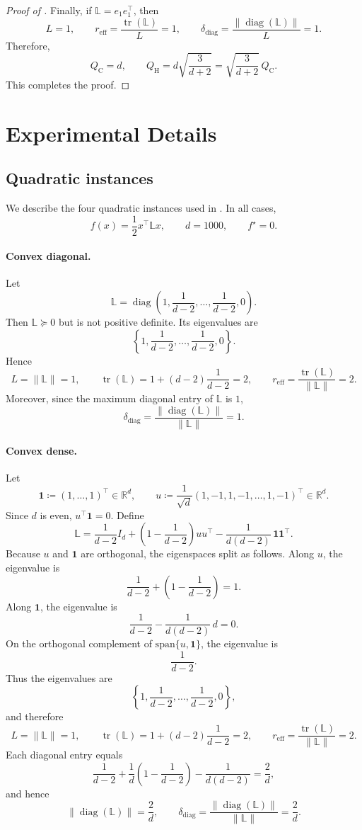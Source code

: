\documentclass[10pt]{article}
\newcommand{\tr}{\operatorname{tr}}
\newcommand{\diag}{\operatorname{diag}}
\newcommand{\R}{\mathbb{R}}
\newcommand{\Lmat}{\mathbb{L}}
\begin{document}
\begin{proof}[Proof of ]
Finally, if \(\Lmat=e_1e_1^\top\), then
\[
L=1,\qquad
r_{\mathrm{eff}}=\frac{\tr(\Lmat)}{L}=1,
\qquad
\delta_{\mathrm{diag}}=\frac{\|\diag(\Lmat)\|}{L}=1.
\]
Therefore,
\[
Q_{\mathrm C}=d,
\qquad
Q_{\mathrm H}
=
d\sqrt{\frac{3}{d+2}}
=
\sqrt{\frac{3}{d+2}}\,Q_{\mathrm C}.
\]
This completes the proof.
\end{proof}

\section{Experimental Details}
\label{app:experiment-details}

\subsection{Quadratic instances}
\label{app:quadratic-details}

We describe the four quadratic instances used in . In all
cases,
\[
f(x)=\frac12 x^\top \Lmat x,
\qquad d=1000,
\qquad f^\star=0.
\]

\paragraph{Convex diagonal.}
Let
\[
\Lmat
=
\diag\!\left(
1,
\frac{1}{d-2},
\ldots,
\frac{1}{d-2},
0
\right).
\]
Then \(\Lmat\succeq 0\) but is not positive definite. Its eigenvalues are
\[
\left\{
1,
\frac{1}{d-2},
\ldots,
\frac{1}{d-2},
0
\right\}.
\]
Hence
\[
L=\|\Lmat\|=1,
\qquad
\tr(\Lmat)=1+(d-2)\frac{1}{d-2}=2,
\qquad
r_{\mathrm{eff}}=\frac{\tr(\Lmat)}{\|\Lmat\|}=2.
\]
Moreover, since the maximum diagonal entry of \(\Lmat\) is \(1\),
\[
\delta_{\mathrm{diag}}
=
\frac{\|\diag(\Lmat)\|}{\|\Lmat\|}
=
1.
\]

\paragraph{Convex dense.}
Let
\[
\mathbf{1}\coloneqq(1,\dots,1)^\top\in\R^d,
\qquad
u\coloneqq\frac{1}{\sqrt d}(1,-1,1,-1,\dots,1,-1)^\top\in\R^d.
\]
Since \(d\) is even, \(u^\top \mathbf{1}=0\). Define
\[
\Lmat
=
\frac{1}{d-2}I_d
+
\left(1-\frac{1}{d-2}\right)uu^\top
-
\frac{1}{d(d-2)}\,\mathbf{1}\mathbf{1}^\top.
\]
Because \(u\) and \(\mathbf{1}\) are orthogonal, the eigenspaces split as
follows. Along \(u\), the eigenvalue is
\[
\frac{1}{d-2}+\left(1-\frac{1}{d-2}\right)=1.
\]
Along \(\mathbf{1}\), the eigenvalue is
\[
\frac{1}{d-2}-\frac{1}{d(d-2)}\,d=0.
\]
On the orthogonal complement of \(\mathrm{span}\{u,\mathbf{1}\}\), the
eigenvalue is
\[
\frac{1}{d-2}.
\]
Thus the eigenvalues are
\[
\left\{
1,
\frac{1}{d-2},
\ldots,
\frac{1}{d-2},
0
\right\},
\]
and therefore
\[
L=\|\Lmat\|=1,
\qquad
\tr(\Lmat)=1+(d-2)\frac{1}{d-2}=2,
\qquad
r_{\mathrm{eff}}=\frac{\tr(\Lmat)}{\|\Lmat\|}=2.
\]
Each diagonal entry equals
\[
\frac{1}{d-2}
+
\frac{1}{d}\left(1-\frac{1}{d-2}\right)
-
\frac{1}{d(d-2)}
=
\frac{2}{d},
\]
and hence
\[
\|\diag(\Lmat)\|=\frac{2}{d},
\qquad
\delta_{\mathrm{diag}}
=
\frac{\|\diag(\Lmat)\|}{\|\Lmat\|}
=
\frac{2}{d}.
\]
\end{document}

